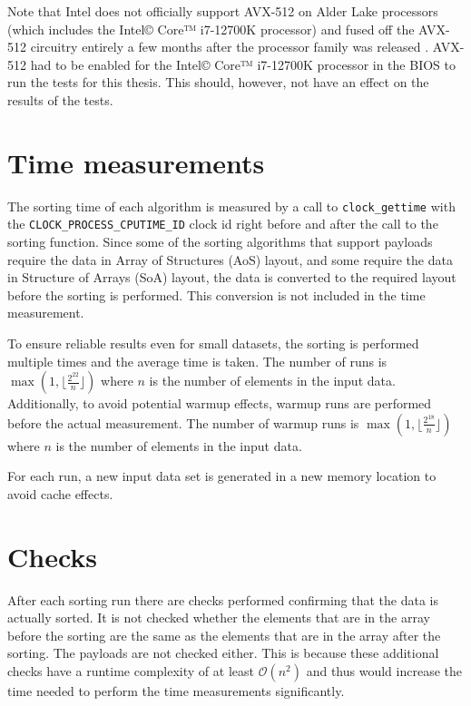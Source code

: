 \documentclass[12pt, a4paper, openright, twoside]{tiarbeit}
\begin{document}
Note that Intel does not officially support AVX-512 on Alder Lake processors
(which includes the Intel© Core™ i7-12700K processor) and fused off the AVX-512
circuitry entirely a few months after the processor family was released
\citep{avx-512-fused-off}.
AVX-512 had to be enabled for the Intel© Core™ i7-12700K processor in the BIOS
to run the tests for this thesis.
This should, however, not have an effect on the results of the tests.


\section{Time measurements}

The sorting time of each algorithm is measured by a call to \texttt{clock\_gettime}
with the \texttt{CLOCK\_PROCESS\_CPUTIME\_ID} clock id
right before and after the call to the sorting function.
Since some of the sorting algorithms that support payloads require the data
in Array of Structures (AoS) layout, and some require the data in Structure of
Arrays (SoA) layout, the data is converted to the required layout before
the sorting is performed. This conversion is not included in the time measurement.

To ensure reliable results even for small datasets, the sorting is performed
multiple times and the average time is taken. The number of runs is
$\max\left(1,\lfloor\frac{2^{22}}{n}\rfloor\right)$ where $n$ is the number of
elements in the input data.
Additionally, to avoid potential warmup effects, warmup runs are performed before the actual
measurement. The number of warmup runs is
$\max\left(1,\lfloor\frac{2^{18}}{n}\rfloor\right)$ where $n$ is the number of
elements in the input data.

For each run, a new input data set is generated in a new memory location to
avoid cache effects.

\section{Checks}

After each sorting run there are checks performed confirming that the data is actually
sorted. It is not checked whether the elements that are in the array
before the sorting are the same as the elements that are in the array after
the sorting. The payloads are not checked either. This is because these
additional checks have a runtime complexity of at least $\mathcal{O}(n^2)$
and thus would increase the time needed to perform the time measurements
significantly.
\end{document}
